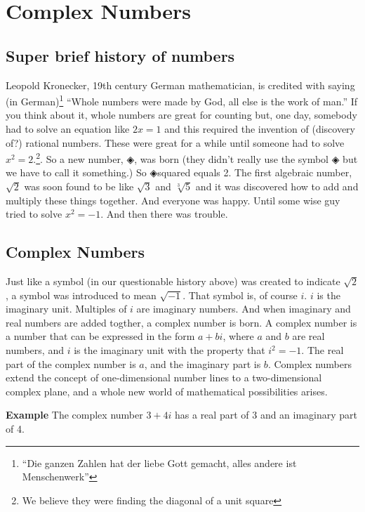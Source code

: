 \documentclass[
]{article}
\author{}
\date{}
\let\oldsection\section
\renewcommand{\section}[1]{\clearpage\oldsection{#1}}
\begin{document}
\section{Complex Numbers}\label{complex-numbers}

\subsection{Super brief history of
numbers}\label{super-brief-history-of-numbers}

Leopold Kronecker, 19th century German mathematician, is credited with
saying (in German)\footnote{``Die ganzen Zahlen hat der liebe Gott
  gemacht, alles andere ist Menschenwerk''} ``Whole numbers were made by
God, all else is the work of man.'' If you think about it, whole numbers
are great for counting but, one day, somebody had to solve an equation
like \(2x=1\) and this required the invention of (discovery of?)
rational numbers. These were great for a while until someone had to
solve \(x^2 = 2\).\footnote{We believe they were finding the diagonal of
  a unit square}. So a new number, ◈, was born (they didn't really use
the symbol ◈ but we have to call it something.) So ◈squared equals 2. The first
algebraic number, \(\sqrt2\) was soon found to be like \(\sqrt3\) and
\(\sqrt[3]5\) and it was discovered how to add and multiply these things
together. And everyone was happy. Until some wise guy tried to solve
\(x^2 = -1\). And then there was trouble.

\subsection{Complex Numbers}\label{complex-numbers-1}

Just like a symbol (in our questionable history above) was created to
indicate \(\sqrt2\), a symbol was introduced to mean \(\sqrt{-1}\). That
symbol is, of course \(i\). \(i\) is the imaginary unit. Multiples of
\(i\) are imaginary numbers. And when imaginary and real numbers are
added togther, a complex number is born. A complex number is a number
that can be expressed in the form \(a + bi\), where \(a\) and \(b\) are
real numbers, and \(i\) is the imaginary unit with the property that
\(i^2 = -1\). The real part of the complex number is \(a\), and the
imaginary part is \(b\). Complex numbers extend the concept of
one-dimensional number lines to a two-dimensional complex plane, and a
whole new world of mathematical possibilities arises.

\textbf{Example} The complex number \(3 + 4i\) has a real part of 3 and
an imaginary part of 4.
\end{document}
